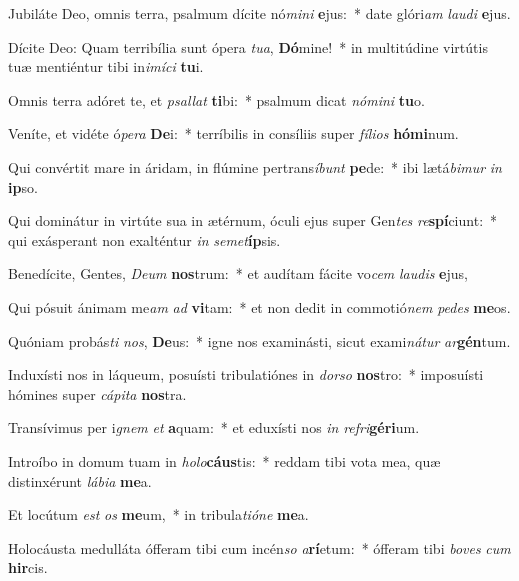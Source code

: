 \item Jubiláte Deo, omnis terra, psalmum dícite nó\textit{mi}\textit{ni} \textbf{e}jus:~* date glóri\textit{am} \textit{lau}\textit{di} \textbf{e}jus.
\item Dícite Deo: Quam terribília sunt ópera \textit{tu}\textit{a}, \textbf{Dó}mine!~* in multitúdine virtútis tuæ mentiéntur tibi in\textit{i}\textit{mí}\textit{ci} \textbf{tu}i.
\item Omnis terra adóret te, et \textit{psal}\textit{lat} \textbf{ti}bi:~* psalmum dicat \textit{nó}\textit{mi}\textit{ni} \textbf{tu}o.
\item Veníte, et vidéte ó\textit{pe}\textit{ra} \textbf{De}i:~* terríbilis in consíliis super \textit{fí}\textit{li}\textit{os} \textbf{hó}\textbf{mi}num.
\item Qui convértit mare in áridam, in flúmine pertrans\textit{í}\textit{bunt} \textbf{pe}de:~* ibi lætá\textit{bi}\textit{mur} \textit{in} \textbf{ip}so.
\item Qui dominátur in virtúte sua in ætérnum, óculi ejus super Gen\textit{tes} \textit{re}\textbf{spí}ciunt:~* qui exásperant non exalténtur \textit{in} \textit{se}\textit{met}\textbf{íp}sis.
\item Benedícite, Gentes, \textit{De}\textit{um} \textbf{nos}trum:~* et audítam fácite vo\textit{cem} \textit{lau}\textit{dis} \textbf{e}jus,
\item Qui pósuit ánimam me\textit{am} \textit{ad} \textbf{vi}tam:~* et non dedit in commotió\textit{nem} \textit{pe}\textit{des} \textbf{me}os.
\item Quóniam probás\textit{ti} \textit{nos}, \textbf{De}us:~* igne nos examinásti, sicut exami\textit{ná}\textit{tur} \textit{ar}\textbf{gén}tum.
\item Induxísti nos in láqueum, posuísti tribulatiónes in \textit{dor}\textit{so} \textbf{nos}tro:~* imposuísti hómines super \textit{cá}\textit{pi}\textit{ta} \textbf{nos}tra.
\item Transívimus per i\textit{gnem} \textit{et} \textbf{a}quam:~* et eduxísti nos \textit{in} \textit{re}\textit{fri}\textbf{gé}\textbf{ri}um.
\item Introíbo in domum tuam in \textit{ho}\textit{lo}\textbf{cáus}tis:~* reddam tibi vota mea, quæ distinxérunt \textit{lá}\textit{bi}\textit{a} \textbf{me}a.
\item Et locútum \textit{est} \textit{os} \textbf{me}um,~* in tribula\textit{ti}\textit{ó}\textit{ne} \textbf{me}a.
\item Holocáusta medulláta ófferam tibi cum incén\textit{so} \textit{a}\textbf{rí}etum:~* ófferam tibi \textit{bo}\textit{ves} \textit{cum} \textbf{hir}cis.
